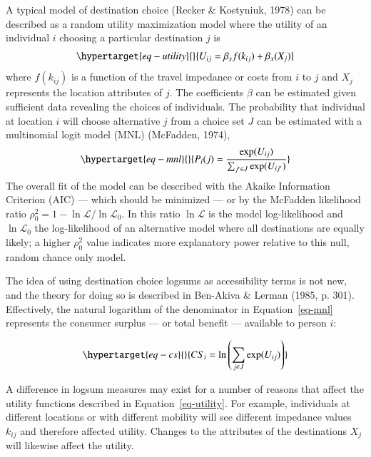 \documentclass[
  letterpaper,
  authoryear,
  review,
  3p]{elsarticle}
\begin{document}
A typical model of destination choice (Recker \& Kostyniuk, 1978) can be
described as a random utility maximization model where the utility of an
individual \(i\) choosing a particular destination \(j\) is
\begin{equation}\protect\hypertarget{eq-utility}{}{ U_{ij} = \beta_{s}f(k_{ij}) + \beta_{x}(X_j) }\label{eq-utility}\end{equation}
where \(f(k_{ij})\) is a function of the travel impedance or costs from
\(i\) to \(j\) and \(X_{j}\) represents the location attributes of
\(j\). The coefficients \(\beta\) can be estimated given sufficient data
revealing the choices of individuals. The probability that individual at
location \(i\) will choose alternative \(j\) from a choice set \(J\) can
be estimated with a multinomial logit model (MNL) (McFadden, 1974),
\begin{equation}\protect\hypertarget{eq-mnl}{}{ P_i(j) = \frac{\exp(U_{ij})}{\sum_{j' \in J}{\exp(U_{ij'})}}}\label{eq-mnl}\end{equation}
The overall fit of the model can be described with the Akaike
Information Criterion (AIC) --- which should be minimized --- or by the
McFadden likelihood ratio
\(\rho^2_0 = 1 - \ln\mathcal{L} / \ln\mathcal{L}_0\). In this ratio
\(\ln{\mathcal{L}}\) is the model log-likelihood and
\(\ln{\mathcal{L}_0}\) the log-likelihood of an alternative model where
all destinations are equally likely; a higher \(\rho^2_0\) value
indicates more explanatory power relative to this null, random chance
only model.

The idea of using destination choice logsums as accessibility terms is
not new, and the theory for doing so is described in Ben-Akiva \& Lerman
(1985, p. 301). Effectively, the natural logarithm of the denominator in
Equation~\ref{eq-mnl} represents the consumer surplus --- or total
benefit --- available to person \(i\):

\begin{equation}\protect\hypertarget{eq-cs}{}{ CS_i = \ln\left(\sum_{j \in J} \exp(U_{ij})\right)}\label{eq-cs}\end{equation}

A difference in logsum measures may exist for a number of reasons that
affect the utility functions described in Equation~\ref{eq-utility}. For
example, individuals at different locations or with different mobility
will see different impedance values \(k_{ij}\) and therefore affected
utility. Changes to the attributes of the destinations \(X_j\) will
likewise affect the utility.
\end{document}
